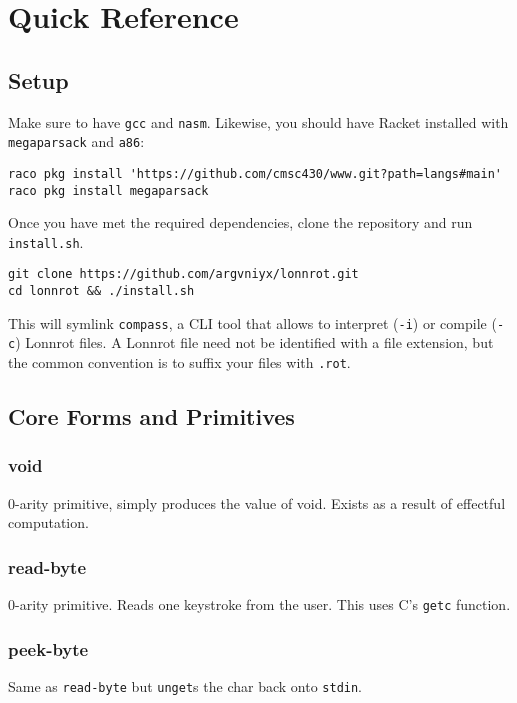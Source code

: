 \chapter{Quick Reference}\label{ch:quickref}

\section{Setup}

Make sure to have \texttt{gcc} and \texttt{nasm}. Likewise, you should have Racket installed with
\texttt{megaparsack} and \texttt{a86}:

\begin{verbatim}
raco pkg install 'https://github.com/cmsc430/www.git?path=langs#main'
raco pkg install megaparsack
\end{verbatim}

\noindent Once you have met the required dependencies, clone the repository and run \texttt{install.sh}.

\begin{verbatim}
git clone https://github.com/argvniyx/lonnrot.git
cd lonnrot && ./install.sh
\end{verbatim}

This will symlink \texttt{compass}, a CLI tool that allows to interpret (\texttt{-i}) or compile
(\texttt{-c}) Lonnrot files. A Lonnrot file need not be identified with a file extension, but the common
convention is to suffix your files with \texttt{.rot}.

\section{Core Forms and Primitives}

\subsection*{void}
0-arity primitive, simply produces the value of void. Exists as a result of effectful computation.

\subsection*{read-byte}
0-arity primitive. Reads one keystroke from the user. This uses C's \texttt{getc} function.

\subsection*{peek-byte}
Same as \texttt{read-byte} but \texttt{unget}s the char back onto \texttt{stdin}.

